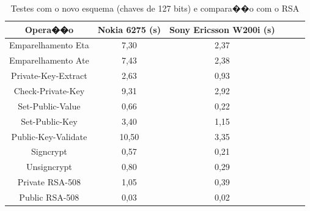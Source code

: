 \documentclass[a4paper,capchap,espacoduplo,normaltoc]{abntepusp}
\begin{document}
\begin{table}[h]\centering
\caption{Testes com o novo esquema (chaves de 127 bits) e compara��o com o RSA}\label{tab:bdcps127}
\begin{tabular}{cccccc}\hline
Opera��o                   & Nokia 6275 (s)   &  Sony Ericsson W200i (s) \\\hline
Emparelhamento Eta         & 7,30                   &  2,37                          \\\hline
Emparelhamento Ate         & 7,43                   &  2,38                          \\\hline
Private-Key-Extract        & 2,63                   &  0,93                          \\\hline
Check-Private-Key          & 9,31                   &  2,92                          \\\hline
Set-Public-Value           & 0,66                   &  0,22                          \\\hline
Set-Public-Key             & 3,40                   &  1,15                          \\\hline
Public-Key-Validate        & 10,50                  &  3,35                          \\\hline
Signcrypt                  & 0,57                   &  0,21                          \\\hline
Unsigncrypt                & 0,80                   &  0,29                          \\\hline
Private RSA-508            & 1,05                   &  0,39                          \\\hline
Public RSA-508             & 0,03                   &  0,02                          \\\hline
\end{tabular}
\end{table}
\end{document}
